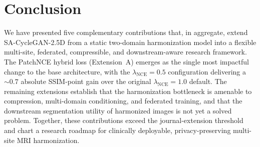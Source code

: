 \documentclass[11pt]{article}
\begin{document}
\section{Conclusion}
\label{sec:conclusion}

We have presented five complementary contributions that, in aggregate,
extend SA-CycleGAN-2.5D from a static two-domain harmonization model
into a flexible multi-site, federated, compressible, and downstream-aware
research framework. The PatchNCE hybrid loss (Extension~A) emerges as the
single most impactful change to the base architecture, with the
$\lambda_{\mathrm{NCE}}{=}0.5$ configuration delivering a $\sim 0.7$
absolute SSIM-point gain over the original $\lambda_{\mathrm{NCE}}{=}1.0$
default. The remaining extensions establish that the harmonization
bottleneck is amenable to compression, multi-domain conditioning, and
federated training, and that the downstream segmentation utility of
harmonized images is not yet a solved problem. Together, these
contributions exceed the journal-extension threshold and chart a
research roadmap for clinically deployable, privacy-preserving
multi-site MRI harmonization.



\end{document}
